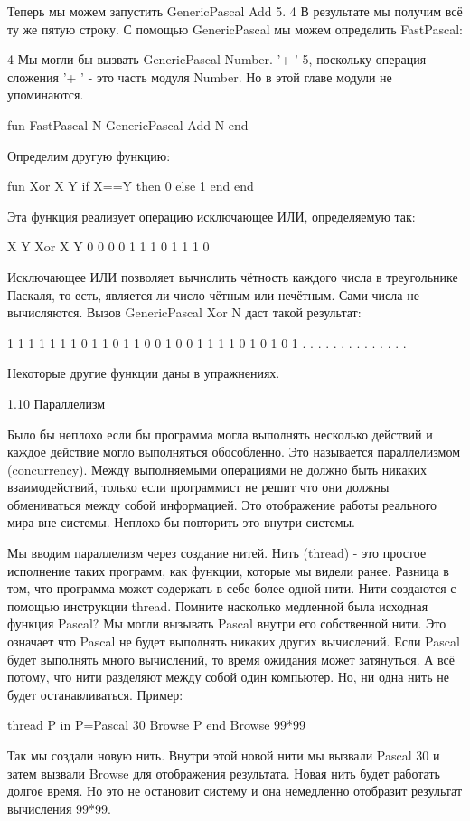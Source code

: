 Теперь мы можем запустить {GenericPascal Add 5}. 4 В результате мы получим всё ту же пятую строку. С помощью GenericPascal мы можем определить FastPascal:

4 Мы могли бы вызвать {GenericPascal Number. '+ ' 5}, поскольку операция сложения  '+ ' - это часть модуля Number. Но в этой главе модули не упоминаются.

fun {FastPascal N} {GenericPascal Add N} end

Определим другую функцию:

fun {Xor X Y} if X==Y then 0 else 1 end end

Эта функция реализует операцию исключающее ИЛИ, определяемую так:

X Y {Xor X Y}
0 0 0
0 1 1
1 0 1
1 1 0

Исключающее ИЛИ позволяет вычислить чётность каждого числа в треугольнике Паскаля, то есть, является ли число чётным или нечётным. Сами числа не вычисляются. Вызов {GenericPascal Xor N} даст такой результат:

1
1
1
1
1
1
1
0
1
1
0
1
1
0
0
1
0
0
1
1
1
1
0
1
0
1
0
1
. . . . . . . . . . . . . .

Некоторые другие функции даны в упражнениях.

1.10 Параллелизм

Было бы неплохо если бы программа могла выполнять несколько действий и каждое действие могло выполняться обособленно. Это называется параллелизмом (concurrency). Между выполняемыми операциями не должно быть никаких взаимодействий, только если программист не решит что они должны обмениваться между собой информацией. Это отображение работы реального мира вне системы. Неплохо бы повторить это внутри системы.

Мы вводим параллелизм через создание нитей. Нить (thread) - это простое исполнение таких программ, как функции, которые мы видели ранее. Разница в том, что программа может содержать в себе более одной нити. Нити создаются с помощью инструкции thread. Помните насколько медленной была исходная функция Pascal? Мы могли вызывать Pascal внутри его собственной нити. Это означает что Pascal не будет выполнять никаких других вычислений. Если Pascal будет выполнять много вычислений, то время ожидания может затянуться. А всё потому, что нити разделяют между собой один компьютер. Но, ни одна нить не будет останавливаться. Пример:

thread P in
P={Pascal 30}
{Browse P}
end
{Browse 99*99}

Так мы создали новую нить. Внутри этой новой нити мы вызвали {Pascal 30} и затем вызвали Browse для отображения результата. Новая нить будет работать долгое время. Но это не остановит систему и она немедленно отобразит результат вычисления 99*99.

